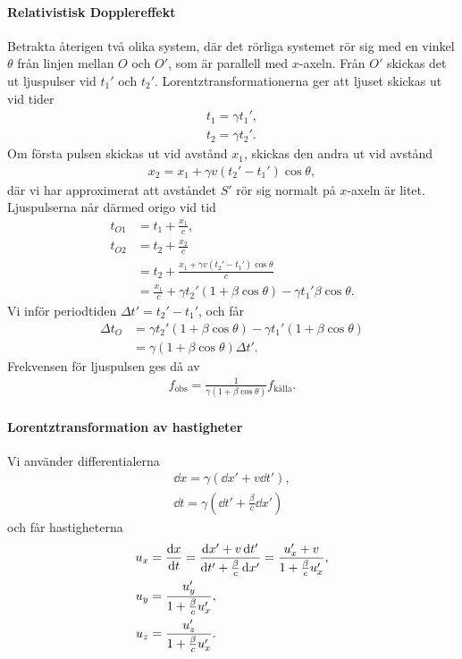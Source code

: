 \paragraph{Relativistisk Dopplereffekt}
Betrakta återigen två olika system, där det rörliga systemet rör sig med en vinkel $\theta$ från linjen mellan $O$ och $O'$, som är parallell med $x$-axeln. Från $O'$ skickas det ut ljuspulser vid $t_{1}'$ och $t_{2}'$. Lorentztransformationerna ger att ljuset skickas ut vid tider
\begin{align*}
	t_{1} = \gamma t_{1}', \\
	t_{2} = \gamma t_{2}'.
\end{align*}
Om första pulsen skickas ut vid avstånd $x_{1}$, skickas den andra ut vid avstånd
\begin{align*}
	x_{2} = x_{1} + \gamma v(t_{2}' - t_{1}')\cos{\theta},
\end{align*}
där vi har approximerat att avståndet $S'$ rör sig normalt på $x$-axeln är litet. Ljuspulserna når därmed origo vid tid
\begin{align*}
	t_{O1} &= t_{1} + \frac{x_{1}}{c}, \\
	t_{O2} &= t_{2} + \frac{x_{2}}{c} \\
	       &= t_{2} + \frac{x_{1} + \gamma v(t_{2}' - t_{1}')\cos{\theta}}{c} \\
	       &= \frac{x_{1}}{c} + \gamma t_{2}'(1 + \beta\cos{\theta}) - \gamma t_{1}'\beta\cos{\theta}.
\end{align*}
Vi inför periodtiden $\Delta t' = t_{2}' - t_{1}'$, och får
\begin{align*}
	\Delta t_{O} &= \gamma t_{2}'(1 + \beta\cos{\theta}) - \gamma t_{1}'(1 + \beta\cos{\theta}) \\
	             &= \gamma (1 + \beta\cos{\theta})\Delta t'.
\end{align*}
Frekvensen för ljuspulsen ges då av
\begin{align*}
	f_{\text{obs}} = \frac{1}{\gamma(1 + \beta\cos{\theta})}f_{\text{källa}}.
\end{align*}

\paragraph{Lorentztransformation av hastigheter}
Vi använder differentialerna
\begin{align*}
	\dd{x} = \gamma(\dd{x'} + v\dd{t'}), \\
	\dd{t} = \gamma(\dd{t'} + \frac{\beta}{c}\dd{x'})
\end{align*}
och får hastigheterna
\begin{align*}
	u_{x} &= \dv{x}{t} = \frac{\dd{x'} + v\dd{t'}}{\dd{t'} + \frac{\beta}{c}\dd{x'}} = \frac{u_{x}' + v}{1 + \frac{\beta}{c}u_{x}'}, \\
	u_{y} &= \frac{u_{y}'}{1 + \frac{\beta}{c}u_{x}'}, \\
	u_{z} &= \frac{u_{z}'}{1 + \frac{\beta}{c}u_{x}'}.
\end{align*}

